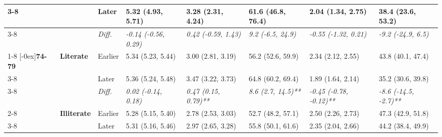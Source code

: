 \documentclass[12pt, a4paper]{article}
\begin{document}
\begin{appendices}
\begin{table}[!p]
{\begin{tabular}[t]{>{}l>{}lllllll}
        \cmidrule{3-8}
                                              &                                      & Later                         & 5.32 (4.93, 5.71)                           & 3.28 (2.31, 4.24)                           & 61.6 (46.8, 76.4)                           & 2.04 (1.34, 2.75)                              & 38.4 (23.6, 53.2)                              \\
        \cmidrule{3-8}
                                              &                                      & \cellcolor{gray!10}\em{Diff.} & \cellcolor{gray!10}\em{-0.14 (-0.56, 0.29)} & \cellcolor{gray!10}\em{0.42 (-0.59, 1.43)}  & \cellcolor{gray!10}\em{9.2 (-6.5, 24.9)}    & \cellcolor{gray!10}\em{-0.55 (-1.32, 0.21)}    & \cellcolor{gray!10}\em{-9.2 (-24.9, 6.5)}      \\
        \cmidrule{1-8}
        \multirow{9}{*}[-0ex]{\textbf{74-79}} & \multirow{3}{*}{\textbf{Literate}}   & Earlier                       & 5.34 (5.23, 5.44)                           & 3.00 (2.81, 3.19)                           & 56.2 (52.6, 59.9)                           & 2.34 (2.12, 2.55)                              & 43.8 (40.1, 47.4)                              \\
        \cmidrule{3-8}
                                              &                                      & Later                         & 5.36 (5.24, 5.48)                           & 3.47 (3.22, 3.73)                           & 64.8 (60.2, 69.4)                           & 1.89 (1.64, 2.14)                              & 35.2 (30.6, 39.8)                              \\
        \cmidrule{3-8}
                                              &                                      & \cellcolor{gray!10}\em{Diff.} & \cellcolor{gray!10}\em{0.02 (-0.14, 0.18)}  & \cellcolor{gray!10}\em{0.47 (0.15, 0.79)**} & \cellcolor{gray!10}\em{8.6 (2.7, 14.5)**}   & \cellcolor{gray!10}\em{-0.45 (-0.78, -0.12)**} & \cellcolor{gray!10}\em{-8.6 (-14.5, -2.7)**}   \\
        \cmidrule{2-8}
                                              & \multirow{3}{*}{\textbf{Illiterate}} & Earlier                       & 5.28 (5.15, 5.40)                           & 2.78 (2.53, 3.03)                           & 52.7 (48.2, 57.1)                           & 2.50 (2.26, 2.73)                              & 47.3 (42.9, 51.8)                              \\
        \cmidrule{3-8}
                                              &                                      & Later                         & 5.31 (5.16, 5.46)                           & 2.97 (2.65, 3.28)                           & 55.8 (50.1, 61.6)                           & 2.35 (2.04, 2.66)                              & 44.2 (38.4, 49.9)                              \\

\end{tabular}}
\end{table}
\end{appendices}
\end{document}
